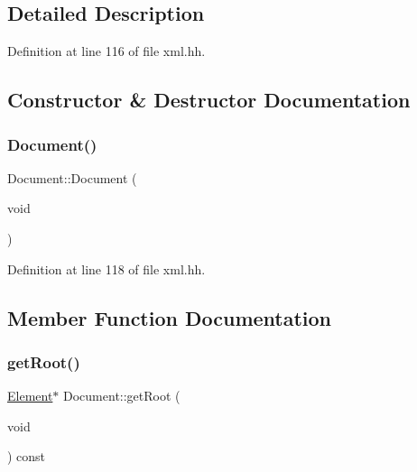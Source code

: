 \subsection{Detailed Description}


Definition at line 116 of file xml.\+hh.



\subsection{Constructor \& Destructor Documentation}
\mbox{\label{class_document_a58318b5709ed43b98630923fd7acdf4e}} 
\subsubsection{\texorpdfstring{Document()}{Document()}}
{\footnotesize\ttfamily Document\+::\+Document (\begin{DoxyParamCaption}\item[{void}]{ }\end{DoxyParamCaption})\hspace{0.3cm}{\ttfamily [inline]}}



Definition at line 118 of file xml.\+hh.



\subsection{Member Function Documentation}
\mbox{\label{class_document_ad9f1827ee45d31ba0a682db474b96c14}} 
\subsubsection{\texorpdfstring{getRoot()}{getRoot()}}
{\footnotesize\ttfamily \mbox{\hyperlink{class_element}{Element}}$\ast$ Document\+::get\+Root (\begin{DoxyParamCaption}\item[{void}]{ }\end{DoxyParamCaption}) const\hspace{0.3cm}{\ttfamily [inline]}}




